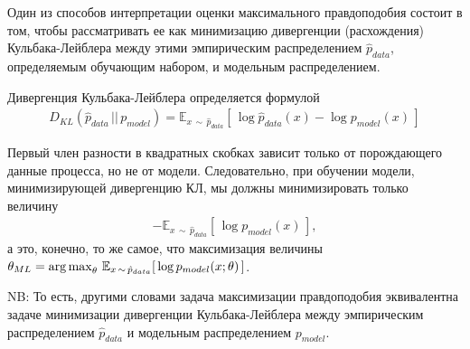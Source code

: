 \documentclass[%
	11pt,
	a4paper,
	utf8,
]{article}
\begin{document}
{\color{blue}Один из способов интерпретации оценки максимального правдоподобия состоит в том, чтобы рассматривать ее как минимизацию дивергенции (расхождения) Кульбака-Лейблера между этими эмпирическим распределением $ \hat{p}_{data} $, определяемым обучающим набором, и модельным распределением.}

Дивергенция Кульбака-Лейблера определяется формулой
\begin{align*}
	D_{KL}(\hat{p}_{data} \, || \, p_{model}) = \mathbb{E}_{ x \, \sim \, \hat{p}_{data} } [\, \log \hat{p}_{data}(x) - \log p_{model}(x) \, ]
\end{align*}

Первый член разности в квадратных скобках зависит только от порождающего данные процесса, но не от модели. Следовательно, при обучении модели, минимизирующей дивергенцию КЛ, мы должны минимизировать только величину
\begin{align*}
	- \mathbb{E}_{ x \, \sim \, \hat{p}_{data} }[\, \log p_{model}(x) \,],
\end{align*}
а это, конечно, то же самое, что максимизация величины $ \theta_{ML} = \operatorname*{arg\,max}_{\theta} \, \mathbb{E}_{x \, \sim \, \hat{p}_{data}} [\, \log p_{model} (x; \theta) \,] $.

NB: То есть, другими словами задача максимизации правдоподобия эквивалентна задаче минимизации дивергенции Кульбака-Лейблера между эмпирическим распределением $ \hat{p}_{data} $ и модельным распределением $ p_{model} $.





\begin{thebibliography}{99}
	
\end{thebibliography}


\end{document}
